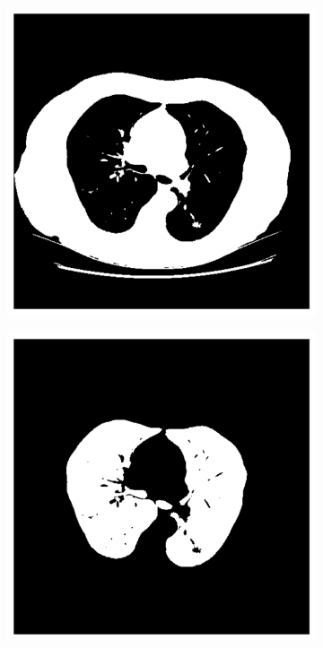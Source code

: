 \documentclass[11pt]{article}
\begin{document}
    \begin{figure}[H]
        \centering
        \begin{subfigure}{.3\textwidth}
            \centering
            \includegraphics[width=\linewidth]{figs/q1a_binary.png}  %
            \caption{}
            \label{fig:otsu_threshold}
        \end{subfigure}%
        \begin{subfigure}{.3\textwidth}
            \centering
            \includegraphics[width=\linewidth]{figs/q1a_largest_connected_components.png}  %

\end{subfigure}
\end{figure}
\end{document}
